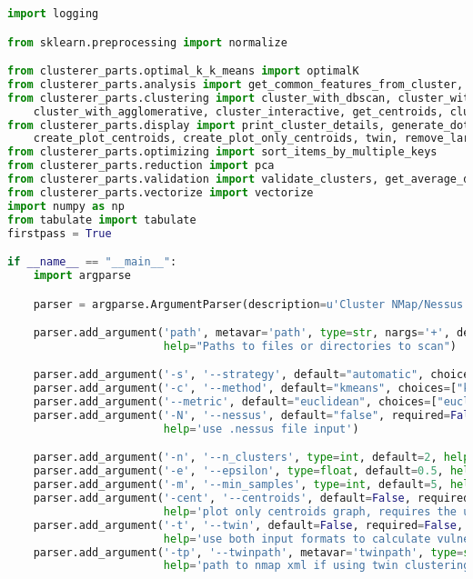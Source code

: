 \begin{lstlisting}[language=python]
import logging

from sklearn.preprocessing import normalize

from clusterer_parts.optimal_k_k_means import optimalK
from clusterer_parts.analysis import get_common_features_from_cluster, get_common_feature_stats
from clusterer_parts.clustering import cluster_with_dbscan, cluster_with_kmeans, precompute_distances, \
    cluster_with_agglomerative, cluster_interactive, get_centroids, cluster_single_kmeans, get_k
from clusterer_parts.display import print_cluster_details, generate_dot_graph_for_gephi, create_plot, \
    create_plot_centroids, create_plot_only_centroids, twin, remove_large_clusters
from clusterer_parts.optimizing import sort_items_by_multiple_keys
from clusterer_parts.reduction import pca
from clusterer_parts.validation import validate_clusters, get_average_distance_per_cluster
from clusterer_parts.vectorize import vectorize
import numpy as np
from tabulate import tabulate
firstpass = True

if __name__ == "__main__":
    import argparse

    parser = argparse.ArgumentParser(description=u'Cluster NMap/Nessus Output')

    parser.add_argument('path', metavar='path', type=str, nargs='+', default=None,
                        help="Paths to files or directories to scan")

    parser.add_argument('-s', '--strategy', default="automatic", choices=["manual", "automatic", "assisted"])
    parser.add_argument('-c', '--method', default="kmeans", choices=["kmeans", "dbscan", "agglomerative"])
    parser.add_argument('--metric', default="euclidean", choices=["euclidean", "cosine", "jaccard"])
    parser.add_argument('-N', '--nessus', default="false", required=False, action='store_true',
                        help='use .nessus file input')

    parser.add_argument('-n', '--n_clusters', type=int, default=2, help='Number of kmeans clusters to aim for')
    parser.add_argument('-e', '--epsilon', type=float, default=0.5, help='DBSCAN Epsilon')
    parser.add_argument('-m', '--min_samples', type=int, default=5, help='DBSCAN Minimum Samples')
    parser.add_argument('-cent', '--centroids', default=False, required=False, action='store_true',
                        help='plot only centroids graph, requires the use of "-p"')
    parser.add_argument('-t', '--twin', default=False, required=False, action='store_true',
                        help='use both input formats to calculate vulnerable single clusters, use with -tp and -N')
    parser.add_argument('-tp', '--twinpath', metavar='twinpath', type=str, required=False,
                        help='path to nmap xml if using twin clustering')


\end{lstlisting}
